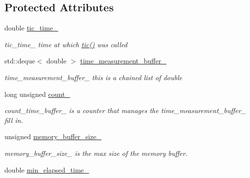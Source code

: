 \subsection*{Protected Attributes}
\begin{DoxyCompactItemize}
\item 
double \hyperlink{classreal__time__tools_1_1Timer_a19c7f3297d2762948843afaba92eade6}{tic\+\_\+time\+\_\+}\hypertarget{classreal__time__tools_1_1Timer_a19c7f3297d2762948843afaba92eade6}{}\label{classreal__time__tools_1_1Timer_a19c7f3297d2762948843afaba92eade6}

\begin{DoxyCompactList}\small\item\em tic\+\_\+time\+\_\+ time at which \hyperlink{classreal__time__tools_1_1Timer_a540f7f6925768c6f333b2fef4a914374}{tic()} was called \end{DoxyCompactList}\item 
std\+::deque$<$ double $>$ \hyperlink{classreal__time__tools_1_1Timer_a9b509f58fc1eef3f7ce4145f75c01fa9}{time\+\_\+measurement\+\_\+buffer\+\_\+}\hypertarget{classreal__time__tools_1_1Timer_a9b509f58fc1eef3f7ce4145f75c01fa9}{}\label{classreal__time__tools_1_1Timer_a9b509f58fc1eef3f7ce4145f75c01fa9}

\begin{DoxyCompactList}\small\item\em time\+\_\+measurement\+\_\+buffer\+\_\+ this is a chained list of double \end{DoxyCompactList}\item 
long unsigned \hyperlink{classreal__time__tools_1_1Timer_a3967e7252cf6d9795e5b04c60763037d}{count\+\_\+}\hypertarget{classreal__time__tools_1_1Timer_a3967e7252cf6d9795e5b04c60763037d}{}\label{classreal__time__tools_1_1Timer_a3967e7252cf6d9795e5b04c60763037d}

\begin{DoxyCompactList}\small\item\em count\+\_\+time\+\_\+buffer\+\_\+ is a counter that manages the time\+\_\+measurement\+\_\+buffer\+\_\+ fill in. \end{DoxyCompactList}\item 
unsigned \hyperlink{classreal__time__tools_1_1Timer_ac0f102a03a84fdebd3803a0199e352a2}{memory\+\_\+buffer\+\_\+size\+\_\+}\hypertarget{classreal__time__tools_1_1Timer_ac0f102a03a84fdebd3803a0199e352a2}{}\label{classreal__time__tools_1_1Timer_ac0f102a03a84fdebd3803a0199e352a2}

\begin{DoxyCompactList}\small\item\em memory\+\_\+buffer\+\_\+size\+\_\+ is the max size of the memory buffer. \end{DoxyCompactList}\item 
double \hyperlink{classreal__time__tools_1_1Timer_a212c2fff68b8098731ab59f14416ce01}{min\+\_\+elapsed\+\_\+time\+\_\+}\hypertarget{classreal__time__tools_1_1Timer_a212c2fff68b8098731ab59f14416ce01}{}\label{classreal__time__tools_1_1Timer_a212c2fff68b8098731ab59f14416ce01}


\end{DoxyCompactItemize}
